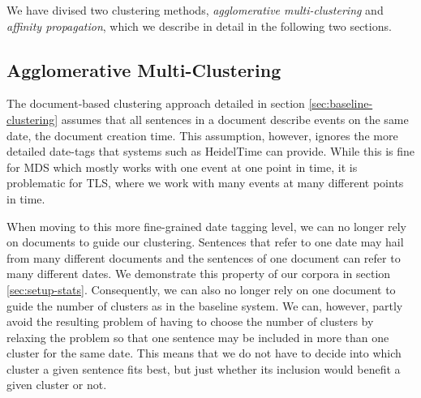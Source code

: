 \documentclass[a4paper,BCOR=10mm]{report}
\numberwithin{lemma}{chapter}
\numberwithin{definition}{chapter}
\begin{document}
We have divised two clustering methods, \textit{agglomerative multi-clustering} and \textit{affinity propagation}, which we describe in detail in the following two sections.

%
%

\subsection{Agglomerative Multi-Clustering}

The document-based clustering approach detailed in section \ref{sec:baseline-clustering} assumes that all sentences in a document describe events on the same date, the document creation time. This assumption, however, ignores the more detailed date-tags that systems such as HeidelTime \citep{heideltime} can provide. While this is fine for MDS which mostly works with one event at one point in time, it is problematic for TLS, where we work with many events at many different points in time.

When moving to this more fine-grained date tagging level, we can no longer rely on documents to guide our clustering. Sentences that refer to one date may hail from many different documents and the sentences of one document can refer to many different dates. We demonstrate this property of our corpora in section \ref{sec:setup-stats}.
Consequently, we can also no longer rely on one document to guide the number of clusters as in the baseline system. We can, however, partly avoid the resulting problem of having to choose the number of clusters by relaxing the problem so that one sentence may be included in more than one cluster for the same date.
This means that we do not have to decide into which cluster a given sentence fits best, but just whether its inclusion would benefit a given cluster or not.
\end{document}
